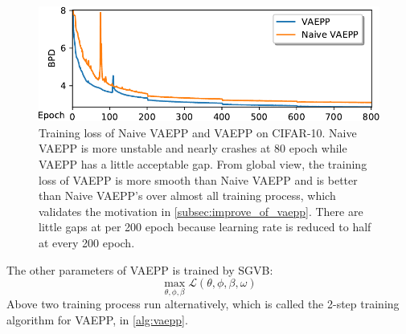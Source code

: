 \begin{figure}[tb]
	\centering
	\includegraphics[width=0.9\columnwidth]{../dist.strip/loss_curves}
	\caption{
	Training loss of Naive VAEPP and VAEPP on CIFAR-10. Naive VAEPP is more unstable and nearly crashes at 80 epoch while VAEPP has a little acceptable gap. From global view, the training loss of VAEPP is more smooth than Naive VAEPP and is better than Naive VAEPP's over almost all training process, which validates the motivation in \cref{subsec:improve_of_vaepp}. There are little gaps at per 200 epoch because learning rate is reduced to half at every 200 epoch. 
	}
	\label{fig:loss_curves}
\end{figure}
The other parameters of VAEPP is trained by SGVB:
\begin{equation*}
	\max_{\theta, \phi, \beta} \mathcal{L}(\theta, \phi, \beta, \omega)
\end{equation*}
Above two training process run alternatively, which is called the 2-step training algorithm for VAEPP, in \cref{alg:vaepp}. 
